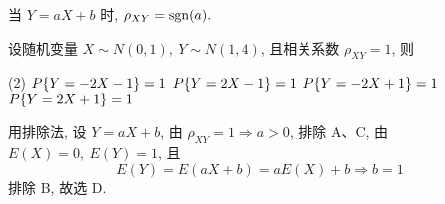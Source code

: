 \begin{theorem}
    当 $Y=aX+b$ 时, $\rho_{XY}=\mathrm{sgn}(a).$
\end{theorem}

\begin{example}
    设随机变量 $X\sim N(0,1),~Y\sim N(1,4)$, 且相关系数 $\rho_{XY}=1$, 则
    \begin{tasks}(2)
        \task $P\qty{Y=-2X -1}=1$
        \task $P\qty{Y=2X -1}=1$
        \task $P\qty{Y=-2X+1}=1$
        \task $P\qty{Y=2X+1}=1$
    \end{tasks}
\end{example}
\begin{solution}
    用排除法, 设 $Y=aX+b$, 由 $\rho_{XY}=1\Rightarrow a>0$, 排除 A、C,
    由 $E(X)=0,~E(Y)=1$, 且 $$E(Y)=E(aX+b)=aE(X)+b\Rightarrow b=1$$
    排除 B, 故选 D.
\end{solution}

